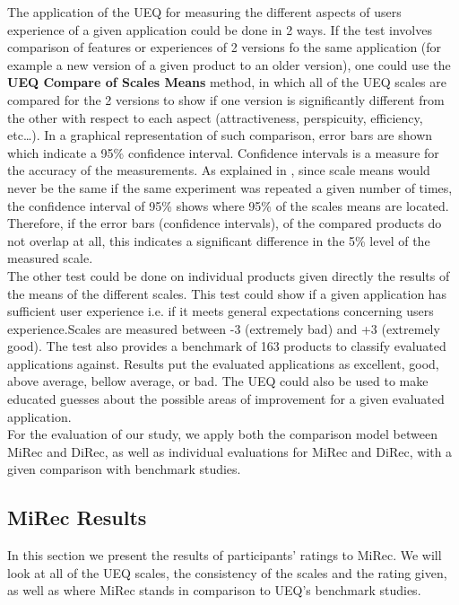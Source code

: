 The application of the UEQ for measuring the different aspects of users
experience of a given application could be done in 2 ways. If the test involves
comparison of features or experiences of 2 versions fo the same application
(for example a new version of a given product to an older version), one could
use the \textbf{UEQ Compare of Scales Means} method, in which all of the UEQ
scales are compared for the 2 versions to show if one version is significantly different
from the other with respect to each aspect (attractiveness, perspicuity,
efficiency, etc\ldots). In a graphical representation of such comparison,
error bars are shown which indicate a 95\% confidence interval. Confidence
intervals is a measure for the accuracy of the measurements. As explained in
\cite{UEQHandbook}, since scale means would never be the same if the same
experiment was repeated a given number of times, the confidence interval of 95\%
shows where 95\% of the scales means are located. Therefore, if the error bars
(confidence intervals), of the compared products do not overlap at all, this
indicates a significant difference in the 5\% level of the measured scale.\\
The other test could be done on individual products given directly the results
of the means of the different scales. This test could show if a given
application has sufficient user experience i.e. if it meets general
expectations concerning users experience.Scales are measured between -3
(extremely bad) and +3 (extremely good). The test also provides a benchmark of
163 products to classify evaluated applications against. Results put the
evaluated applications as excellent, good, above average, bellow average,
or bad. The UEQ could also be used to make educated guesses about the possible
areas of improvement for a given evaluated application.\\
For the evaluation of our study, we apply both the comparison model between
MiRec and DiRec, as well as individual evaluations for MiRec and DiRec, with a
given comparison with benchmark studies.\\

\subsection{MiRec Results}
In this section we present the results of participants' ratings to MiRec. We
will look at all of the UEQ scales, the consistency of the scales and the rating
given, as well as where MiRec stands in comparison to UEQ's benchmark studies.

